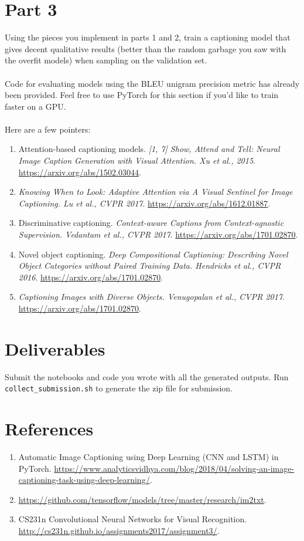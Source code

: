 \documentclass[english]{article}
\begin{document}
\section{Part 3}
Using the pieces you implement in parts 1 and 2, train a captioning model that gives decent qualitative results (better than the random garbage you saw with the overfit models) when sampling on the validation set.\\\\
Code for evaluating models using the BLEU unigram precision metric has already been provided. Feel free to use PyTorch for this section if you’d like to train faster on a GPU.\\\\
Here are a few pointers:\\
\begin{enumerate}
\item Attention-based captioning models. \textit{[1, 7] Show, Attend and Tell: Neural Image Caption Generation with Visual Attention. Xu et al., 2015}. \url{https://arxiv.org/abs/1502.03044}.
\item \textit{Knowing When to Look: Adaptive Attention via A Visual Sentinel for Image Captioning. Lu et al., CVPR 2017}. \url{https://arxiv.org/abs/1612.01887}.
\item Discriminative captioning. \textit{Context-aware Captions from Context-agnostic Supervision. Vedantam et al., CVPR 2017}. \url{https://arxiv.org/abs/1701.02870}.
\item Novel object captioning. \textit{Deep Compositional Captioning: Describing Novel Object Categories without Paired Training Data. Hendricks et al., CVPR 2016}. \url{https://arxiv.org/abs/1701.02870}.
\item \textit{Captioning Images with Diverse Objects. Venugopalan et al., CVPR 2017}. \url{https://arxiv.org/abs/1701.02870}.
\end{enumerate}
\section{Deliverables}
Submit the notebooks and code you wrote with all the generated outputs. Run \texttt{collect\_submission.sh} to generate the zip file for submission.

\section{References}
\begin{enumerate}
    \item Automatic Image Captioning using Deep Learning (CNN and LSTM) in PyTorch. \url{https://www.analyticsvidhya.com/blog/2018/04/solving-an-image-captioning-task-using-deep-learning/}.
    \item \url{https://github.com/tensorflow/models/tree/master/research/im2txt}.
    \item CS231n Convolutional Neural Networks for Visual Recognition. \url{http://cs231n.github.io/assignments2017/assignment3/}.
    \end{enumerate}
\end{document}
